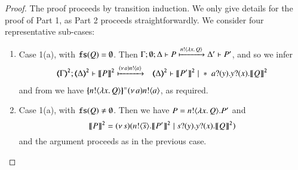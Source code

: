 \begin{proof}
	\noi The proof proceeds by transition induction.
	We only give details for the proof of Part 1, as Part 2 proceeds straightforwardly.
%
    We consider four representative sub-cases:
    \begin{enumerate}[1.]
	\item Case 1(a), with $\mathtt{fs}(Q) = \emptyset$. 
Then
		$\Gamma; \emptyset; \Delta \vdash P \xmapsto{n !\langle \lambda x.\,Q \rangle}  \Delta' \vdash P'$, 
		and so we infer
					\begin{eqnarray*}
		\tmap{\Gamma}{2};  \tmap{\Delta}{2} \proves \pmap{P}{2} &\hby{\news{a} \bactout{n}{a}}& \tmap{\Delta}{2} \proves \pmap{P'}{2} \Par \repl{ \binp{a}{y} \binp{y}{x} \pmap{Q}{2}}
	\end{eqnarray*}
%
	\noi and from  we have 		$\{\!\!\{n ! \langle \lambda x.\,Q \rangle\}\!\!\}^{\mathtt{=}} (\nu\, a) n ! \langle a \rangle$, 
as required.

	\item Case 1(a), with $\mathtt{fs}(Q) \neq \emptyset$. Then we have $P= n ! \langle \lambda x.\,Q \rangle . P'$ 
and
	$$\llbracket P\rrbracket^\mathtt{2} = (\nu\, s)(n ! \langle \overline{s} \rangle . \llbracket P'\rrbracket^\mathtt{2} \;|\; s ? (y) . y ? (x) . \llbracket Q\rrbracket^\mathtt{2})$$
	and the argument proceeds as in the previous case.


\end{enumerate}
\end{proof}
